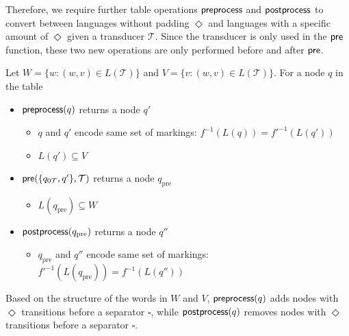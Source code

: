 Therefore, we require further table operations $\operatorname{\textsf{preprocess}}$ and $\operatorname{\textsf{postprocess}}$ to convert between languages without padding $\Diamond$ and languages with a specific amount of $\Diamond$ given a transducer $\mathcal{T}$. Since the transducer is only used in the $\operatorname{\textsf{pre}}$ function, these two new operations are only performed before and after $\operatorname{\textsf{pre}}$. 



Let $W = \{ w : (w,v) \in L(\mathcal{T}) \}$ and $V = \{ v: (w,v) \in L(\mathcal{T}) \}$.
For a node $q$ in the table 
\begin{itemize}[-,noitemsep]
\item $\operatorname{\textsf{preprocess}}(q)$ returns a node $q'$
\begin{itemize}
\item $q$ and $q'$ encode same set of markings: $f^{-1}(L(q)) = f'^{-1}(L(q'))$ 
\item $L(q') \subseteq V$
\end{itemize}

\item $\operatorname{\textsf{pre}}(\{q_{0\mathcal{T}},q'\},\mathcal{T})$ returns a node $q_{\text{pre}}$
\begin{itemize}
\item $L(q_{\text{pre}}) \subseteq W $
\end{itemize}

\item $\operatorname{\textsf{postprocess}}(q_{\text{pre}})$ returns a node $q''$
\begin{itemize}
\item $q_{\text{pre}}$ and $q''$ encode same set of markings: $f'^{-1}(L(q_{\text{pre}})) = f^{-1}(L(q''))$ 
\end{itemize}

\end{itemize}

Based on the structure of the words in $W$ and $V$, $\operatorname{\textsf{preprocess}}(q)$ adds nodes with $\Diamond$ transitions before a separator $\square$, while $\operatorname{\textsf{postprocess}}(q)$ removes nodes with $\Diamond$ transitions before a separator $\square$.





